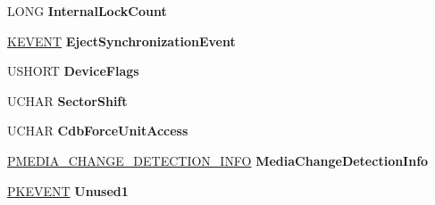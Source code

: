 \begin{DoxyCompactItemize}
\mbox{\label{struct___f_u_n_c_t_i_o_n_a_l___d_e_v_i_c_e___e_x_t_e_n_s_i_o_n_a546d61fb5750b4a7d89ead3ac430858f}} 
L\+O\+NG {\bfseries Internal\+Lock\+Count}
\item 
\mbox{\label{struct___f_u_n_c_t_i_o_n_a_l___d_e_v_i_c_e___e_x_t_e_n_s_i_o_n_a946efb861a9bf72afe9d7adc2ac5442b}} 
\hyperlink{struct___k_e_v_e_n_t}{K\+E\+V\+E\+NT} {\bfseries Eject\+Synchronization\+Event}
\item 
\mbox{\label{struct___f_u_n_c_t_i_o_n_a_l___d_e_v_i_c_e___e_x_t_e_n_s_i_o_n_ad50bf1e4dd7a9a09869a721af95d3b4d}} 
U\+S\+H\+O\+RT {\bfseries Device\+Flags}
\item 
\mbox{\label{struct___f_u_n_c_t_i_o_n_a_l___d_e_v_i_c_e___e_x_t_e_n_s_i_o_n_a80662868ec4e21844bfaf548ac22a0e7}} 
U\+C\+H\+AR {\bfseries Sector\+Shift}
\item 
\mbox{\label{struct___f_u_n_c_t_i_o_n_a_l___d_e_v_i_c_e___e_x_t_e_n_s_i_o_n_a8a6cbecf8baa2e3555dd051bdce7c98e}} 
U\+C\+H\+AR {\bfseries Cdb\+Force\+Unit\+Access}
\item 
\mbox{\label{struct___f_u_n_c_t_i_o_n_a_l___d_e_v_i_c_e___e_x_t_e_n_s_i_o_n_ae795483d3dc78ae056d671088ad5b000}} 
\hyperlink{struct___m_e_d_i_a___c_h_a_n_g_e___d_e_t_e_c_t_i_o_n___i_n_f_o}{P\+M\+E\+D\+I\+A\+\_\+\+C\+H\+A\+N\+G\+E\+\_\+\+D\+E\+T\+E\+C\+T\+I\+O\+N\+\_\+\+I\+N\+FO} {\bfseries Media\+Change\+Detection\+Info}
\item 
\mbox{\label{struct___f_u_n_c_t_i_o_n_a_l___d_e_v_i_c_e___e_x_t_e_n_s_i_o_n_a6c697d67adb7b4579950d65d86ae5633}} 
\hyperlink{struct___k_e_v_e_n_t}{P\+K\+E\+V\+E\+NT} {\bfseries Unused1}
\item 
\mbox{\label{struct___f_u_n_c_t_i_o_n_a_l___d_e_v_i_c_e___e_x_t_e_n_s_i_o_n_a2c049bf73294b9b1edc9188abebca130}} 

\end{DoxyCompactItemize}
